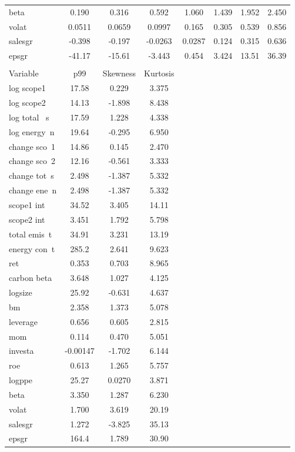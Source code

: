 \documentclass[]{article}
\begin{document}
\begin{tabular}{lccccccc}
beta & 0.190 & 0.316 & 0.592 & 1.060 & 1.439 & 1.952 & 2.450 \\
volat & 0.0511 & 0.0659 & 0.0997 & 0.165 & 0.305 & 0.539 & 0.856 \\
salesgr & -0.398 & -0.197 & -0.0263 & 0.0287 & 0.124 & 0.315 & 0.636 \\
epsgr & -41.17 & -15.61 & -3.443 & 0.454 & 3.424 & 13.51 & 36.39 \\
 &  &  &  &  &  &  &  \\
Variable & p99 & Skewness & Kurtosis &  &  &  &  \\
log scope1 & 17.58 & 0.229 & 3.375 &  &  &  &  \\
log scope2 & 14.13 & -1.898 & 8.438 &  &  &  &  \\
log total ~s & 17.59 & 1.228 & 4.338 &  &  &  &  \\
log energy~n & 19.64 & -0.295 & 6.950 &  &  &  &  \\
change sco~1 & 14.86 & 0.145 & 2.470 &  &  &  &  \\
change sco~2 & 12.16 & -0.561 & 3.333 &  &  &  &  \\
change tot~s & 2.498 & -1.387 & 5.332 &  &  &  &  \\
change ene~n & 2.498 & -1.387 & 5.332 &  &  &  &  \\
scope1 int & 34.52 & 3.405 & 14.11 &  &  &  &  \\
scope2 int & 3.451 & 1.792 & 5.798 &  &  &  &  \\
total emis~t & 34.91 & 3.231 & 13.19 &  &  &  &  \\
energy con~t & 285.2 & 2.641 & 9.623 &  &  &  &  \\
ret & 0.353 & 0.703 & 8.965 &  &  &  &  \\
carbon beta & 3.648 & 1.027 & 4.125 &  &  &  &  \\
logsize & 25.92 & -0.631 & 4.637 &  &  &  &  \\
bm & 2.358 & 1.373 & 5.078 &  &  &  &  \\
leverage & 0.656 & 0.605 & 2.815 &  &  &  &  \\
mom & 0.114 & 0.470 & 5.051 &  &  &  &  \\
investa & -0.00147 & -1.702 & 6.144 &  &  &  &  \\
roe & 0.613 & 1.265 & 5.757 &  &  &  &  \\
logppe & 25.27 & 0.0270 & 3.871 &  &  &  &  \\
beta & 3.350 & 1.287 & 6.230 &  &  &  &  \\
volat & 1.700 & 3.619 & 20.19 &  &  &  &  \\
salesgr & 1.272 & -3.825 & 35.13 &  &  &  &  \\
 epsgr & 164.4 & 1.789 & 30.90 &  &  &  &  \\ \hline
\end{tabular}
\end{document}
